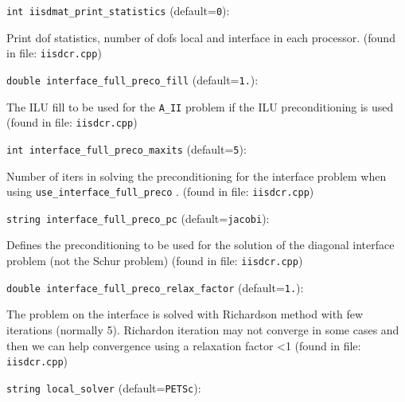 \item\verb+int iisdmat_print_statistics+ {\rm(default=\verb|0|)}:

Print dof statistics, number of dofs local and interface in each
processor. 
 (found in file: \verb+iisdcr.cpp+)
\item\verb+double interface_full_preco_fill+ {\rm(default=\verb|1.|)}:

The ILU fill to be used for the \verb+A_II+ problem if the
ILU preconditioning is used
 (found in file: \verb+iisdcr.cpp+)
\item\verb+int interface_full_preco_maxits+ {\rm(default=\verb|5|)}:

Number of iters in solving the preconditioning for the 
interface problem when using  \verb+use_interface_full_preco+ . 
 (found in file: \verb+iisdcr.cpp+)
\item\verb+string interface_full_preco_pc+ {\rm(default=\verb|jacobi|)}:

Defines the preconditioning to be used for the solution
of the diagonal interface problem (not the Schur problem)
 (found in file: \verb+iisdcr.cpp+)
\item\verb+double interface_full_preco_relax_factor+ {\rm(default=\verb|1.|)}:

The problem on the interface is solved with Richardson method
with few iterations (normally 5). Richardon iteration may not
converge in some cases and then we can help convergence using a
relaxation factor <1
 (found in file: \verb+iisdcr.cpp+)
\item\verb+string local_solver+ {\rm(default=\verb|PETSc|)}:

